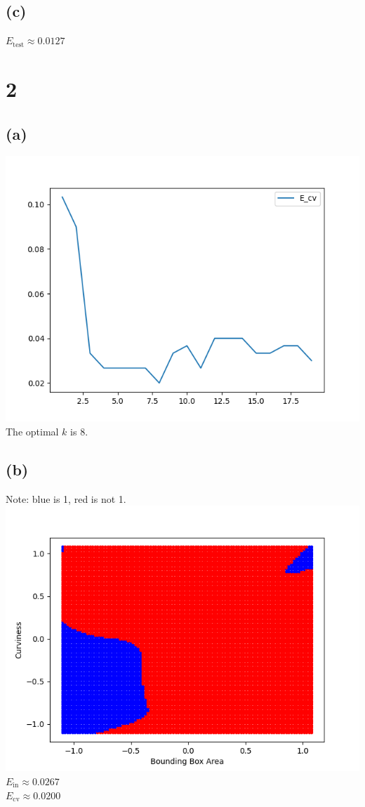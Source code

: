 \documentclass{article}
\begin{document}
	\subsection*{(c)}
		$E_\text{test} \approx 0.0127$
		
	\section*{2}
	\subsection*{(a)}
		\includegraphics[scale=0.8]{2a.png}\\
		The optimal $k$ is 8.
	\subsection*{(b)}
		Note: blue is 1, red is not 1.\\
		\includegraphics[scale=0.8]{2b.png}\\
		$E_\text{in} \approx 0.0267$\\
		$E_\text{cv} \approx 0.0200$
\end{document}
